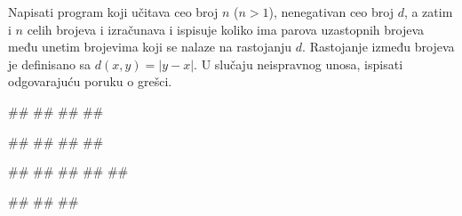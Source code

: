 \begin{Exercise}[label=PET_26] 
Napisati program koji učitava ceo broj $n$ ($n>1$), nenegativan ceo broj $d$, a zatim i
$n$ celih brojeva i izračunava i ispisuje koliko ima parova
uzastopnih brojeva među unetim brojevima koji se nalaze na rastojanju
$d$. Rastojanje između brojeva je definisano sa $d(x,y)=|y-x|$.
U slučaju neispravnog unosa, ispisati odgovarajuću poruku o grešci.

\begin{miditest}
\begin{upotreba}{1}
#\naslovInt#
##
##
##
\end{upotreba}
\end{miditest}
\begin{miditest}
\begin{upotreba}{2}
#\naslovInt#
##
##
##
\end{upotreba}
\end{miditest}

\sstrana
{}
\begin{miditest}
\begin{upotreba}{3}
#\naslovInt#
##
##
##
##
\end{upotreba}
\end{miditest}
\begin{miditest}
\begin{upotreba}{4}
#\naslovInt#
##
##
\end{upotreba}
\end{miditest}

\end{Exercise}
\ifresenja
\begin{Answer}[ref=PET_26]
\end{Answer}
\fi


